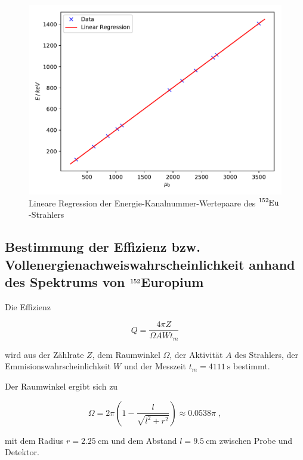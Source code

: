 \begin{figure}[H]
  \centering
  \includegraphics[scale=0.7]{content/plot5.pdf}
  \caption{Lineare Regression der Energie-Kanalnummer-Wertepaare des $\ce{^{152}Eu}$-Strahlers}
  \label{fig:plot5}
\end{figure}



\subsection{Bestimmung der Effizienz bzw. Vollenergienachweiswahrscheinlichkeit anhand des Spektrums von $\ce{^{152}}$Europium}

Die Effizienz

\begin{equation}
  Q = \frac{4 \pi Z}{\Omega A W t_m}
  \label{eqn:akt}
\end{equation}

wird aus der Zählrate  $Z$, dem Raumwinkel $\Omega$, der Aktivität $A$ des Strahlers, 
der Emmisionswahrscheinlichkeit $W$ und der Messzeit $t_m = \SI{4111}{\second}$ bestimmt.

Der Raumwinkel ergibt sich zu 

\begin{equation}
  \Omega = 2 \pi \left(1 - \frac{l}{\sqrt{l^2 + r^2}}\right) \approx \num{0.0538} \pi \; ,
\end{equation} 

mit dem Radius $r = \SI{2.25}{\centi\meter}$ und dem Abstand $l = \SI{9.5}{\centi\meter}$ zwischen Probe und Detektor.

